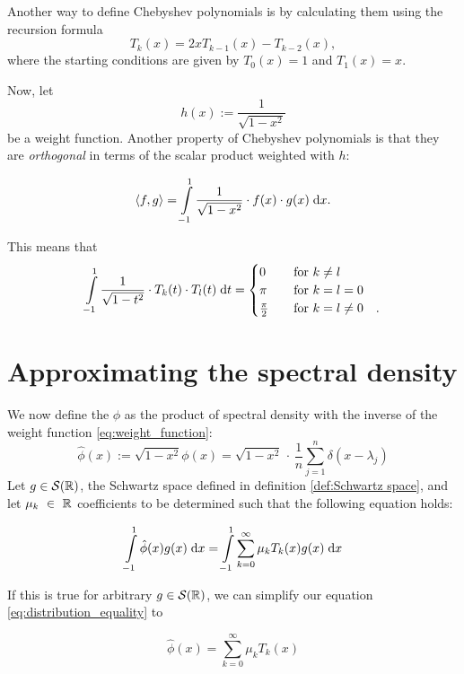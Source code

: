Another way to define Chebyshev polynomials is by calculating them using the recursion formula
\[
T_{k}(x) = 2xT_{k - 1}(x) - T_{k - 2}(x),
\]
where the starting conditions are given by $T_0(x) = 1$ and $T_1(x) = x$.

Now, let
\begin{equation} \label{eq:weight_function}
    h(x) := \frac{1}{\sqrt{1 - x^2}}
\end{equation}
be a weight function.
Another property of Chebyshev polynomials is
that they are \emph{orthogonal} in terms of the scalar product weighted with $h$:

\[
\left \langle f, g \right \rangle = \int\limits_{-1}^1 \frac{1}{\sqrt{1 - x^2}} \cdot f(x) \cdot g(x) \;\mathrm{d}x.
\]

This means that
\begin{equation} \label{eq:orthogonality}
\int\limits_{-1}^1 \frac{1}{\sqrt{1 - t^2}} \cdot T_k(t) \cdot T_l(t) \;\mathrm{d}t =
\begin{cases}
    0               & \quad \text{for } k \neq l\\
    \pi             & \quad \text{for } k = l = 0\\
    \frac{\pi}{2}   & \quad \text{for } k = l \neq 0 \quad .
\end{cases}
\end{equation}

\section{Approximating the spectral density}
We now define the $\hat{\phi}$ as the product of spectral density with the inverse of the weight function \ref{eq:weight_function}:
\[
\hat{\phi}(x) := \sqrt{1 - x^2} \phi(x) = \sqrt{1 - x^2} \, \cdot \, \frac{1}{n} \sum_{j = 1}^n \delta(x - \lambda_j)
\]
Let $g \in \mathcal{S}(\mathbb{R})$, the Schwartz space defined in definition \ref{def:Schwartz space}, and let $\mu_k~\in~\mathbb{R}$ coefficients to be determined such that the following equation holds:

\begin{equation} \label{eq:distribution_equality}
    \int \limits_{-1}^1 \hat{\phi}(x) g(x) \;\mathrm{d}x = \int \limits_{-1}^1 \sum_{k = 0}^{\infty} \mu_k T_k(x) g(x) \;\mathrm{d}x
\end{equation}

If this is true for arbitrary $g \in \mathcal{S}(\mathbb{R})$, we can simplify our equation \ref{eq:distribution_equality} to

\begin{equation} \label{eq:Chebyshev-Expansion}
    \hat{\phi}(x) = \sum_{k = 0}^{\infty} \mu_k T_k(x)
\end{equation}


